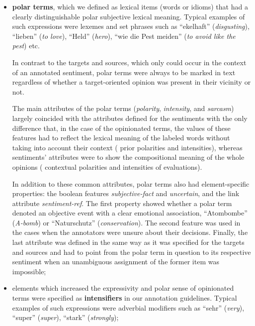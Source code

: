 \begin{itemize}
\item
  \textbf{polar terms}, which we defined as lexical items
  (words or idioms) that had a clearly distinguishable polar
  subjective lexical meaning.  Typical examples of such expressions
  were lexemes and set phrases such as ``ekelhaft''
  (\emph{disgusting}), ``lieben'' (\emph{to love}), ``Held''
  (\emph{hero}), ``wie die Pest meiden'' (\emph{to avoid like the
    pest}) etc.

  In contrast to the targets and sources, which only could occur in
  the context of an annotated sentiment, polar terms were
  always to be marked in text regardless of whether a target-oriented
  opinion was present in their vicinity or not.

  The main attributes of the polar terms (\emph{polarity},
  \emph{intensity}, and \emph{sarcasm}) largely coincided with the
  attributes defined for the sentiments with the only difference that,
  in the case of the opinionated terms, the values of these features
  had to reflect the lexical meaning of the labeled words without
  taking into account their context (\ie{} prior polarities and
  intensities), whereas sentiments' attributes were to show the
  compositional meaning of the whole opinions (\ie{} contextual
  polarities and intensities of evaluations).

  In addition to these common attributes, polar terms also had
  element-specific properties: the boolean features
  \emph{subjective-fact} and \emph{uncertain}, and the link attribute
  \emph{sentiment-ref}.  The first property showed whether a polar
  term denoted an objective event with a clear emotional association,
  \eg{} ``Atombombe'' (\emph{A-bomb}) or ``Naturschutz''
  (\emph{conservation}).  The second feature was used in the cases
  when the annotators were unsure about their decisions.  Finally, the
  last attribute was defined in the same way as it was specified for
  the targets and sources and had to point from the polar term in
  question to its respective sentiment when an unambiguous assignment
  of the former item was impossible;

\item
  elements which increased the expressivity and polar sense of
  opinionated terms were specified as \textbf{intensifiers} in our
  annotation guidelines.  Typical examples of such expressions were
  adverbial modifiers such as ``sehr'' (\emph{very}), ``super''
  (\emph{super}), ``stark'' (\emph{strongly});


\end{itemize}
